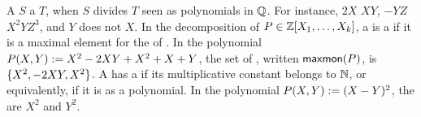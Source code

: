 \AP A  $S$  a  $T$, when $S$ divides
$T$ seen as polynomials in $\mathbb{Q}$. For instance, $2X$  $XY$, $-YZ$
 $X^2 Y Z^3$, and $Y$ does not  $X$. In the
decomposition of $P \in \mathbb{Z}[X_1, \dots, X_k]$, a  is a
 if it is a maximal element for the  of . In the polynomial $P(X,Y) \mathrel{:=} X^2 - 2XY + X^2
+ X + Y$, the set of , written
$\mathop{\mathsf{maxmon}}(P)$, is $\mathopen{\{} X^2,  -2 XY,  X^2 \mathclose{\}}$. A  has a
 if its multiplicative constant belongs to
$\mathbb{N}$, or equivalently, if it is  as a polynomial. In the
polynomial $P(X,Y) \mathrel{:=} (X - Y)^2$, the  are $X^2$
and $Y^2$.




